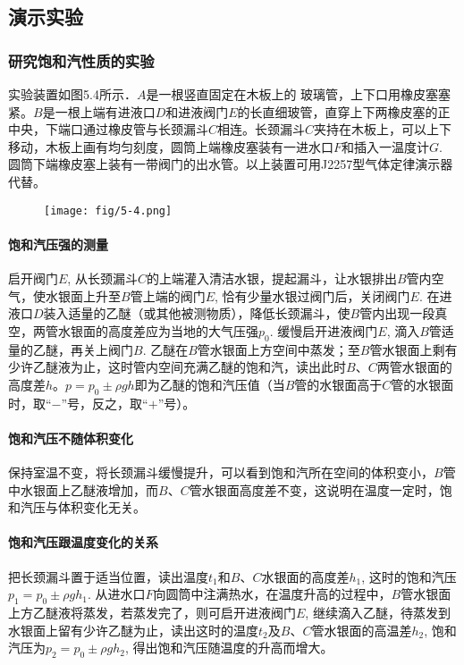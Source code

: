 \subsection{演示实验}
\subsubsection{研究饱和汽性质的实验}

实验装置如图5.4所示．$A$是一根竖直固定在木板上的
玻璃管，上下口用橡皮塞塞紧。$B$是一根上端有进液口$D$和进液阀门$E$的长直细玻管，直穿上下两橡皮塞的正中央，下端口通过橡皮管与长颈漏斗$C$相连。长颈漏斗$C$夹持在木板上，可以上下移动，木板上画有均匀刻度，圆筒上端橡皮塞装有一进水口$F$和插入一温度计$G$. 圆筒下端橡皮塞上装有一带阀门的出水管。以上装置可用J2257型气体定律演示器代替。
\begin{figure}[htp]
    \centering
      \texttt{[image: fig/5-4.png]}
    \caption{}
\end{figure}

\paragraph{饱和汽压强的测量}
启开阀门$E$, 从长颈漏斗$C$的上端灌入清洁水银，提起漏斗，让水银排出$B$管内空气，使水银面上升至$B$管上端的阀门$E$, 恰有少量水银过阀门后，关闭阀门$E$. 在进液口$D$装入适量的乙醚（或其他被测物质），降低长颈漏斗，使$B$管内出现一段真空，两管水银面的高度差应为当地的大气压强$p_0$. 缓慢启开进液阀门$E$, 滴入$B$管适量的乙醚，再关上阀门$B$. 乙醚在$B$管水银面上方空间中蒸发；至$B$管水银面上剩有少许乙醚液为止，这时管内空间充满乙醚的饱和汽，读出此时$B$、$C$两管水银面的高度差$h$。$p=p_0\pm \rho gh$即为乙醚的饱和汽压值（当$B$管的水银面高于$C$管的水银面时，取“$-$”号，反之，取“$+$”号）。

\paragraph{饱和汽压不随体积变化}
保持室温不变，将长颈漏斗缓慢提升，可以看到饱和汽所在空间的体积变小，$B$管中水银面上乙醚液增加，而$B$、$C$管水银面高度差不变，这说明在温度一定时，饱和汽压与体积变化无关。

\paragraph{饱和汽压跟温度变化的关系}
把长颈漏斗置于适当位置，读出温度$t_1$和$B$、$C$水银面的高度差$h_1$, 这时的饱和汽压$p_1=p_0\pm\rho gh_1$. 从进水口$F$向圆筒中注满热水，在温度升高的过程中，$B$管水银面上方乙醚液将蒸发，若蒸发完了，则可启开进液阀门$E$, 继续滴入乙醚，待蒸发到水银面上留有少许乙醚为止，读出这时的温度$t_2$及$B$、$C$管水银面的高温差$h_2$, 饱和汽压为$p_2=p_0\pm \rho gh_2$, 得出饱和汽压随温度的升高而增大。

